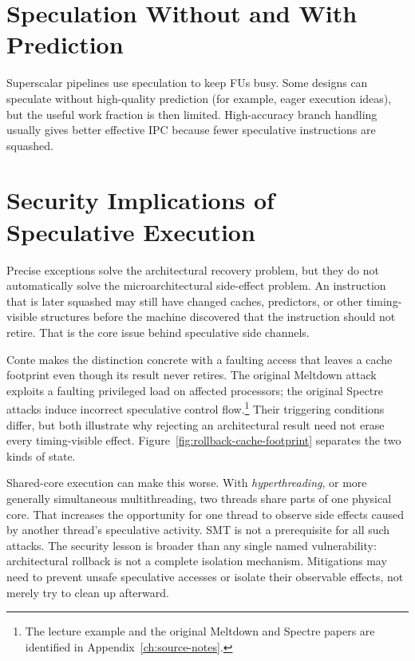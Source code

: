 \section{Speculation Without and With Prediction}\label{sec:ilp-speculation}
Superscalar pipelines use speculation to keep FUs busy.
Some designs can speculate without high-quality prediction (for example, eager execution ideas), but the useful work fraction is then limited.
High-accuracy branch handling usually gives better effective IPC because fewer speculative instructions are squashed.


\section{Security Implications of Speculative Execution}\label{sec:ilp-security}
Precise exceptions solve the architectural recovery problem, but they do not automatically solve the microarchitectural side-effect problem.
An instruction that is later squashed may still have changed caches, predictors, or other timing-visible structures before the machine discovered that the instruction should not retire.
That is the core issue behind speculative side channels.

Conte makes the distinction concrete with a faulting access that leaves a cache footprint even though its result never retires.
The original Meltdown attack exploits a faulting privileged load on affected processors; the original Spectre attacks induce incorrect speculative control flow.\footnote{The lecture example and the original Meltdown and Spectre papers are identified in Appendix~\ref{ch:source-notes}.}
Their triggering conditions differ, but both illustrate why rejecting an architectural result need not erase every timing-visible effect.
Figure~\ref{fig:rollback-cache-footprint} separates the two kinds of state.



Shared-core execution can make this worse.
With \textit{hyperthreading}, or more generally simultaneous multithreading, two threads share parts of one physical core.
That increases the opportunity for one thread to observe side effects caused by another thread's speculative activity.
SMT is not a prerequisite for all such attacks.
The security lesson is broader than any single named vulnerability: architectural rollback is not a complete isolation mechanism.
Mitigations may need to prevent unsafe speculative accesses or isolate their observable effects, not merely try to clean up afterward.


